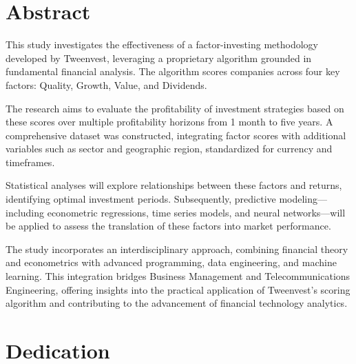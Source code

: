 \documentclass[11pt,english,a4paper,hidelinks]{book}
\begin{document}
\renewcommand{\listtablename}{List of Tables} 
\renewcommand{\tablename}{Table} 

 
\newpage
\thispagestyle{empty}

\section*{Abstract}
\noindent This study investigates the effectiveness of a factor-investing methodology developed by Tweenvest, leveraging a proprietary algorithm grounded in fundamental financial analysis. The algorithm scores companies across four key factors: Quality, Growth, Value, and Dividends.

\vspace{0.5cm}

\noindent The research aims to evaluate the profitability of investment strategies based on these scores over multiple profitability horizons from 1 month to five years. A comprehensive dataset was constructed, integrating factor scores with additional variables such as sector and geographic region, standardized for currency and timeframes.

\vspace{0.5cm}

\noindent Statistical analyses will explore relationships between these factors and returns, identifying optimal investment periods. Subsequently, predictive modeling—including econometric regressions, time series models, and neural networks—will be applied to assess the translation of these factors into market performance.

\vspace{0.5cm}

\noindent The study incorporates an interdisciplinary approach, combining financial theory and econometrics with advanced programming, data engineering, and machine learning. This integration bridges Business Management and Telecommunications Engineering, offering insights into the practical application of Tweenvest's scoring algorithm and contributing to the advancement of financial technology analytics.


\newpage
\thispagestyle{empty}
\section*{Dedication}
\end{document}
